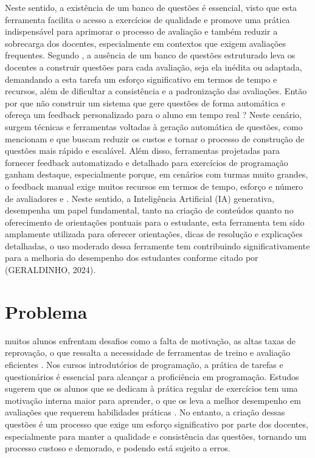 Neste sentido, a existência de um banco de questões é essencial, visto que esta ferramenta facilita o acesso a exercícios de qualidade e promove uma prática indispensável para aprimorar o processo de avaliação e também reduzir a sobrecarga dos docentes, especialmente em contextos que exigem avaliações frequentes. Segundo   \parencite{Puthiaparampil2020} , a ausência de um banco de questões estruturado leva os docentes a construir questões  para cada avaliação, seja ela inédita ou adaptada,  demandando a esta tarefa um esforço significativo em termos de tempo e recursos, além de dificultar a consistência e a padronização das avaliações. Então por que não construir um sistema que gere questões de forma automática e ofereça um feedback personalizado para o aluno em tempo real ? Neste cenário, surgem técnicas e ferramentas voltadas à geração automática de questões, como mencionam \parencite{kurdi2020} e \parencite{sewunetie2022}  que buscam reduzir os custos e tornar o processo de construção de questões mais rápido e escalável. Além disso, ferramentas projetadas para fornecer feedback automatizado e detalhado para exercícios de programação ganham destaque, especialmente porque, em cenários com turmas muito grandes, o feedback manual exige muitos recursos em termos de tempo, esforço e número de avaliadores \parencite{vanpraet2024} e \parencite{fung2024}.   Neste sentido, a Inteligência Artificial (IA) generativa, desempenha um papel fundamental, tanto na criação de conteúdos quanto no oferecimento de orientações pontuais para o estudante, esta ferramenta tem sido amplamente utilizada para oferecer orientações, dicas de resolução e explicações detalhadas, o uso moderado dessa ferramente tem contribuindo significativamente para a melhoria do desempenho dos estudantes conforme citado por (GERALDINHO, 2024).


\section{Problema}
muitos alunos enfrentam desafios como a falta de motivação, as altas taxas de reprovação, o que ressalta a necessidade de ferramentas de treino e avaliação eficientes \parencite{mbiada2022}. Nos cursos introdutórios de programação, a prática de  tarefas e questionários é essencial para alcançar a proficiência em programação. Estudos sugerem que os alunos que se dedicam à prática regular de exercícios tem uma motivação interna maior para aprender, o que os leva a melhor desempenho em avaliações que requerem habilidades práticas \parencite{Edwards2019}. No entanto, a criação dessas questões é um processo que exige um esforço significativo por parte dos docentes, especialmente para manter a qualidade e consistência das questões, tornando um processo custoso e demorado, e podendo está  sujeito a erros.

